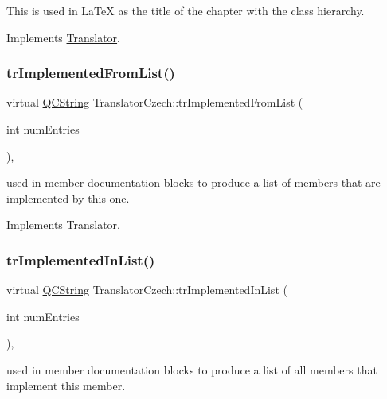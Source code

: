 This is used in La\+TeX as the title of the chapter with the class hierarchy. 

Implements \mbox{\hyperlink{class_translator}{Translator}}.

\mbox{\label{class_translator_czech_a70f7c22ba1a47b14f1c7babd702475a6}} 
\subsubsection{\texorpdfstring{trImplementedFromList()}{trImplementedFromList()}}
{\footnotesize\ttfamily virtual \mbox{\hyperlink{class_q_c_string}{Q\+C\+String}} Translator\+Czech\+::tr\+Implemented\+From\+List (\begin{DoxyParamCaption}\item[{int}]{num\+Entries }\end{DoxyParamCaption})\hspace{0.3cm}{\ttfamily [inline]}, {\ttfamily [virtual]}}

used in member documentation blocks to produce a list of members that are implemented by this one. 

Implements \mbox{\hyperlink{class_translator}{Translator}}.

\mbox{\label{class_translator_czech_aebab1abf725031307c6182dfd88bd15f}} 
\subsubsection{\texorpdfstring{trImplementedInList()}{trImplementedInList()}}
{\footnotesize\ttfamily virtual \mbox{\hyperlink{class_q_c_string}{Q\+C\+String}} Translator\+Czech\+::tr\+Implemented\+In\+List (\begin{DoxyParamCaption}\item[{int}]{num\+Entries }\end{DoxyParamCaption})\hspace{0.3cm}{\ttfamily [inline]}, {\ttfamily [virtual]}}

used in member documentation blocks to produce a list of all members that implement this member. 

